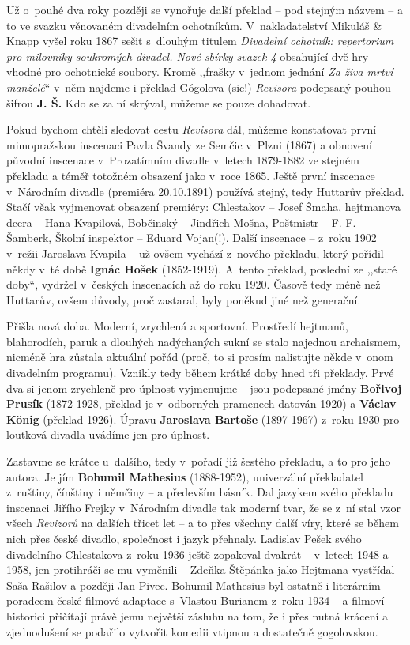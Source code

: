 Už o~pouhé dva roky později se vynořuje další překlad – pod stejným názvem – a to ve svazku věnovaném divadelním ochotníkům. V nakladatelství Mikuláš \& Knapp vyšel roku 1867 sešit s dlouhým titulem \textit{Divadelní ochotník: repertorium pro milovníky soukromých divadel. Nové sbírky svazek 4} obsahující dvě hry vhodné pro ochotnické soubory. Kromě ,,frašky v~jednom jednání \textit{Za živa mrtví manželé}`` v něm najdeme i překlad Gógolova (sic!) \textit{Revisora} podepsaný pouhou šifrou \textbf{J. Š.} Kdo se za ní skrýval, můžeme se pouze dohadovat.

Pokud bychom chtěli sledovat cestu \textit{Revisora} dál, můžeme konstatovat první mimopražskou inscenaci Pavla Švandy ze Semčic v Plzni (1867) a obnovení původní inscenace v Prozatímním divadle v letech 1879-1882 ve stejném překladu a téměř totožném obsazení jako v~roce 1865. Ještě první inscenace v Národním divadle (premiéra 20.10.1891) používá stejný, tedy Huttarův překlad. Stačí však vyjmenovat obsazení premiéry: Chlestakov – Josef Šmaha, hejtmanova dcera – Hana Kvapilová, Bobčinský – Jindřich Mošna, Poštmistr – F. F. Šamberk, Školní inspektor – Eduard Vojan(!). Další inscenace – z roku 1902 v režii Jaroslava Kvapila – už ovšem vychází z nového překladu, který pořídil někdy v té době \textbf{Ignác Hošek} (1852-1919). A~tento překlad, poslední ze ,,staré doby``, vydržel v českých inscenacích až do roku 1920. Časově tedy méně než Huttarův, ovšem důvody, proč zastaral, byly poněkud jiné než generační.

Přišla nová doba. Moderní, zrychlená a sportovní. Prostředí hejtmanů, blahorodích, paruk a dlouhých nadýchaných sukní se stalo najednou archaismem, nicméně hra zůstala aktuální pořád (proč, to si prosím nalistujte někde v onom divadelním programu). Vznikly tedy během krátké doby hned tři překlady. Prvé dva si jenom zrychleně pro úplnost vyjmenujme – jsou podepsané jmény \textbf{Bořivoj Prusík} (1872-1928, překlad je v odborných pramenech datován 1920) a \textbf{Václav König} (překlad 1926).  Úpravu \textbf{Jaroslava Bartoše} (1897-1967) z roku 1930 pro loutková divadla uvádíme jen pro úplnost.

Zastavme se krátce u~dalšího, tedy v pořadí již šestého překladu, a to pro jeho autora. Je jím \textbf{Bohumil Mathesius} (1888-1952), univerzální překladatel z ruštiny, čínštiny i němčiny – a především básník. Dal jazykem svého překladu inscenaci Jiřího Frejky v Národním divadle tak moderní tvar, že se z ní stal vzor všech \textit{Revizorů} na dalších třicet let – a to přes všechny další víry, které se během nich přes české divadlo, společnost i jazyk přehnaly. Ladislav Pešek svého divadelního Chlestakova z roku 1936 ještě zopakoval dvakrát – v letech 1948 a 1958, jen protihráči se mu vyměnili – Zdeňka Štěpánka jako Hejtmana vystřídal Saša Rašilov a později Jan Pivec. Bohumil Mathesius byl ostatně i literárním poradcem české filmové adaptace s~Vlastou Burianem z~roku 1934 – a filmoví historici přičítají právě jemu největší zásluhu na tom, že i přes nutná krácení a zjednodušení se podařilo vytvořit komedii vtipnou a dostatečně gogolovskou.


